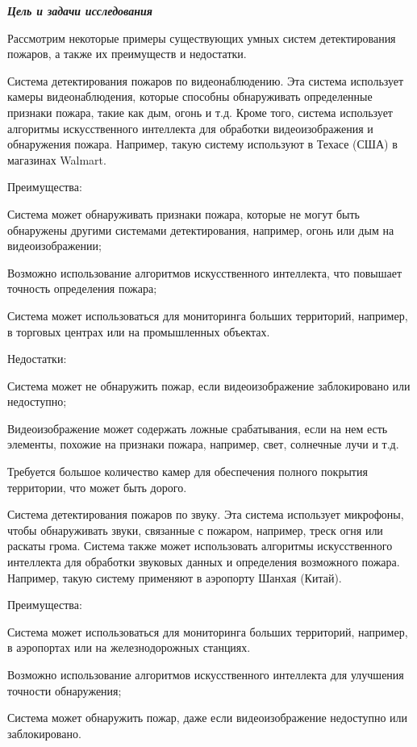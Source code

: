 \begin{multicols}{2}
{\bfseries \emph{Цель и задачи исследования}}

Рассмотрим некоторые примеры существующих умных систем детектирования
пожаров, а также их преимуществ и недостатки.

Система детектирования пожаров по видеонаблюдению. Эта система
использует камеры видеонаблюдения, которые способны обнаруживать
определенные признаки пожара, такие как дым, огонь и т.д. Кроме того,
система использует алгоритмы искусственного интеллекта для обработки
видеоизображения и обнаружения пожара. Например, такую систему
используют в Техасе (США) в магазинах Walmart.

Преимущества:

Система может обнаруживать признаки пожара, которые не могут быть
обнаружены другими системами детектирования, например, огонь или дым
на видеоизображении;

Возможно использование алгоритмов искусственного интеллекта, что
повышает точность определения пожара;

Система может использоваться для мониторинга больших территорий,
например, в торговых центрах или на промышленных объектах.

Недостатки:

Система может не обнаружить пожар, если видеоизображение заблокировано
или недоступно;

Видеоизображение может содержать ложные срабатывания, если на нем есть
элементы, похожие на признаки пожара, например, свет, солнечные лучи и
т.д.

Требуется большое количество камер для обеспечения полного покрытия
территории, что может быть дорого.

Система детектирования пожаров по звуку. Эта система использует
микрофоны, чтобы обнаруживать звуки, связанные с пожаром, например,
треск огня или раскаты грома. Система также может использовать алгоритмы
искусственного интеллекта для обработки звуковых данных и определения
возможного пожара. Например, такую систему применяют в аэропорту Шанхая
(Китай).

Преимущества:

Система может использоваться для мониторинга больших территорий,
например, в аэропортах или на железнодорожных станциях.

Возможно использование алгоритмов искусственного интеллекта для
улучшения точности обнаружения;

Система может обнаружить пожар, даже если видеоизображение недоступно
или заблокировано.


\end{multicols}
